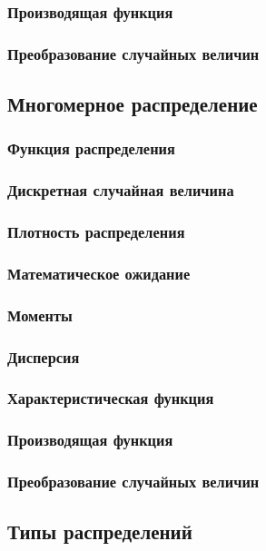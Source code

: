 \subsubsection{Производящая функция}
\subsubsection{Преобразование случайных величин}

\subsection{Многомерное распределение}

\subsubsection{Функция распределения}
\subsubsection{Дискретная случайная величина}
\subsubsection{Плотность распределения}
\subsubsection{Математическое ожидание}
\subsubsection{Моменты}
\subsubsection{Дисперсия}
\subsubsection{Характеристическая функция}
\subsubsection{Производящая функция}
\subsubsection{Преобразование случайных величин}

\subsection{Типы распределений}


